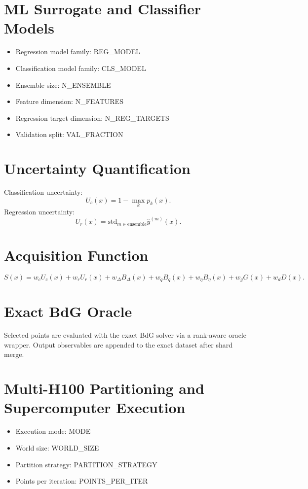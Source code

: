 \documentclass[11pt]{article}
\begin{document}
\section{ML Surrogate and Classifier Models}
\begin{itemize}
\item Regression model family: {{REG_MODEL}}
\item Classification model family: {{CLS_MODEL}}
\item Ensemble size: {{N_ENSEMBLE}}
\item Feature dimension: {{N_FEATURES}}
\item Regression target dimension: {{N_REG_TARGETS}}
\item Validation split: {{VAL_FRACTION}}
\end{itemize}

\section{Uncertainty Quantification}
Classification uncertainty:
\[
U_c(x) = 1 - \max_k p_k(x).
\]
Regression uncertainty:
\[
U_r(x) = \mathrm{std}_{m \in \text{ensemble}} \hat{y}^{(m)}(x).
\]

\section{Acquisition Function}
\[
S(x) =
w_c U_c(x)
+ w_r U_r(x)
+ w_\Delta B_\Delta(x)
+ w_q B_q(x)
+ w_\eta B_\eta(x)
+ w_g G(x)
+ w_d D(x).
\]

\section{Exact BdG Oracle}
Selected points are evaluated with the exact BdG solver via a rank-aware oracle wrapper. Output observables are appended to the exact dataset after shard merge.

\section{Multi-H100 Partitioning and Supercomputer Execution}
\begin{itemize}
\item Execution mode: {{MODE}}
\item World size: {{WORLD_SIZE}}
\item Partition strategy: {{PARTITION_STRATEGY}}
\item Points per iteration: {{POINTS_PER_ITER}}
\end{itemize}
\end{document}
